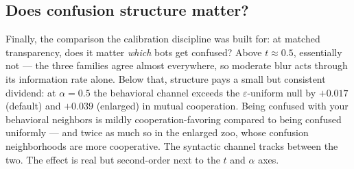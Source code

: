 \documentclass[11pt]{article}
\begin{document}
\subsection{Does confusion structure matter?}

Finally, the comparison the calibration discipline was built for: at
matched transparency, does it matter \emph{which} bots get confused? Above
$t \approx 0.5$, essentially not --- the three families agree almost
everywhere, so moderate blur acts through its information rate alone.
Below that, structure pays a small but consistent dividend: at
$\alpha = 0.5$ the behavioral channel exceeds the $\varepsilon$-uniform
null by $+0.017$ (default) and $+0.039$ (enlarged) in mutual cooperation.
Being confused with your behavioral neighbors is mildly
cooperation-favoring compared to being confused uniformly --- and twice
as much so in the enlarged zoo, whose confusion neighborhoods are more
cooperative. The syntactic channel tracks between the two. The effect is
real but second-order next to the $t$ and $\alpha$ axes.
\end{document}
